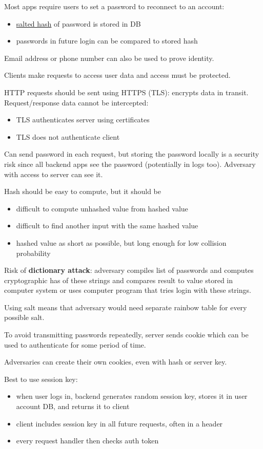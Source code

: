 \documentclass[11pt]{article}
\begin{document}
Most apps require users to set a password to reconnect to an account:
\begin{itemize}
\item \uline{salted hash} of password is stored in DB
\item passwords in future login can be compared to stored hash
\end{itemize}

Email address or phone number can also be used to prove identity.

Clients make requests to access user data and access must be
protected.

HTTP requests should be sent using HTTPS (TLS): encrypts data in
transit.
Request/response data cannot be intercepted:
\begin{itemize}
\item TLS authenticates server using certificates
\item TLS does not authenticate client
\end{itemize}

Can send password in each request, but storing the password locally
is a security risk since all backend apps see the password (potentially
in logs too).
Adversary with access to server can see it.

Hash should be easy to compute, but it should be
\begin{itemize}
\item difficult to compute unhashed value from hashed value
\item difficult to find another input with the same hashed value
\item hashed value as short as possible, but long enough for low
collision probability
\end{itemize}

Risk of \textbf{dictionary attack}: adversary compiles list of passwords
and computes cryptographic has of these strings and compares result
to value stored in computer system or uses computer program that
tries login with these strings.

Using salt means that adversary would need separate rainbow table
for every possible salt.

To avoid transmitting passwords repeatedly, server sends cookie
which can be used to authenticate for some period of time.

Adversaries can create their own cookies, even with hash or
server key.

Best to use session key:
\begin{itemize}
\item when user logs in, backend generates random session key, stores
it in user account DB, and returns it to client
\item client includes session key in all future requests, often in a header
\item every request handler then checks auth token
\end{itemize}
\end{document}
